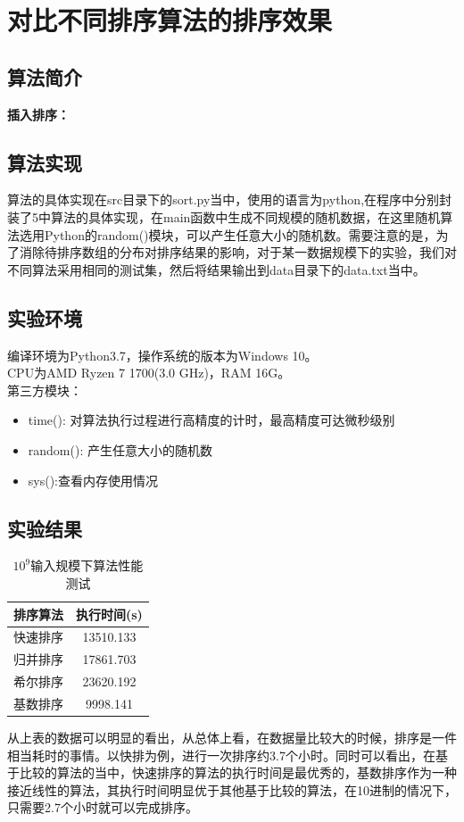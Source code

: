 \documentclass[UTF8]{ctexart}
\begin{document}
\section{对比不同排序算法的排序效果}

\subsection{算法简介}

\textbf{插入排序：}\\


\subsection{算法实现}

算法的具体实现在src目录下的sort.py当中，使用的语言为python,在程序中分别封装了5中算法的具体实现，在main函数中生成不同规模的随机数据，在这里随机算法选用Python的random()模块，可以产生任意大小的随机数。需要注意的是，为了消除待排序数组的分布对排序结果的影响，对于某一数据规模下的实验，我们对不同算法采用相同的测试集，然后将结果输出到data目录下的data.txt当中。

\subsection{实验环境}
编译环境为Python3.7，操作系统的版本为Windows 10。\\
CPU为AMD Ryzen 7 1700(3.0 GHz)，RAM 16G。\\
第三方模块：
\begin{itemize}
\item time(): 对算法执行过程进行高精度的计时，最高精度可达微秒级别
\item random(): 产生任意大小的随机数
\item sys():查看内存使用情况
\end{itemize}

\subsection{实验结果}


\begin{table}[H]
    \caption{$10^9$输入规模下算法性能测试}
    \label{table-1}
    \begin{center}
        \begin{tabular}{cc}
            \hline
            排序算法&   执行时间(s)\\     
            \hline
            快速排序&       13510.133\\               
            归并排序&       17861.703\\              
            希尔排序&       23620.192\\             
            基数排序&      9998.141\\                      
            \hline
        \end{tabular}  
    \end{center}
\end{table}

从上表的数据可以明显的看出，从总体上看，在数据量比较大的时候，排序是一件相当耗时的事情。以快排为例，进行一次排序约3.7个小时。同时可以看出，在基于比较的算法的当中，快速排序的算法的执行时间是最优秀的，基数排序作为一种接近线性的算法，其执行时间明显优于其他基于比较的算法，在10进制的情况下，只需要2.7个小时就可以完成排序。
\end{document}
